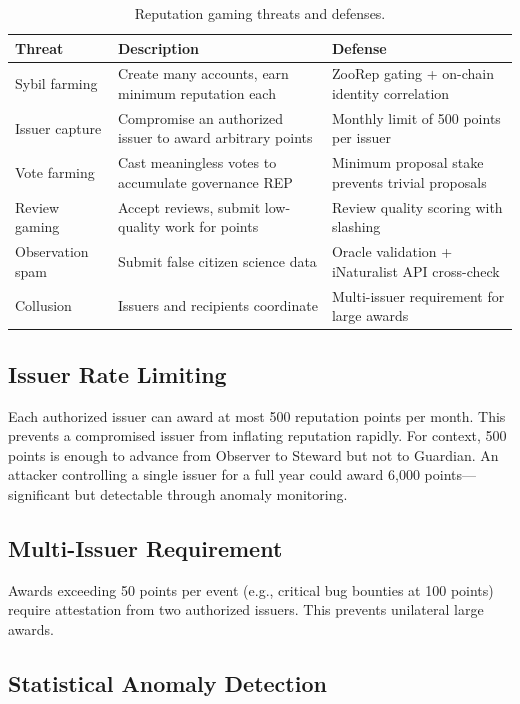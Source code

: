 \documentclass[11pt,letterpaper]{article}
\begin{document}
\begin{table}[h]
\centering
\caption{Reputation gaming threats and defenses.}
\label{tab:gaming}
\begin{tabular}{p{3cm}p{4cm}p{4.5cm}}
\toprule
\textbf{Threat} & \textbf{Description} & \textbf{Defense} \\
\midrule
Sybil farming & Create many accounts, earn minimum reputation each & ZooRep gating + on-chain identity correlation \\
Issuer capture & Compromise an authorized issuer to award arbitrary points & Monthly limit of 500 points per issuer \\
Vote farming & Cast meaningless votes to accumulate governance REP & Minimum proposal stake prevents trivial proposals \\
Review gaming & Accept reviews, submit low-quality work for points & Review quality scoring with slashing \\
Observation spam & Submit false citizen science data & Oracle validation + iNaturalist API cross-check \\
Collusion & Issuers and recipients coordinate & Multi-issuer requirement for large awards \\
\bottomrule
\end{tabular}
\end{table}

\subsection{Issuer Rate Limiting}

Each authorized issuer can award at most 500 reputation points per month. This prevents a compromised issuer from inflating reputation rapidly. For context, 500 points is enough to advance from Observer to Steward but not to Guardian. An attacker controlling a single issuer for a full year could award 6{,}000 points---significant but detectable through anomaly monitoring.

\subsection{Multi-Issuer Requirement}

Awards exceeding 50 points per event (e.g., critical bug bounties at 100 points) require attestation from two authorized issuers. This prevents unilateral large awards.

\subsection{Statistical Anomaly Detection}
\end{document}
